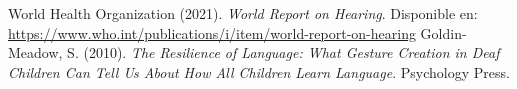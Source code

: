 \documentclass[12pt]{article}
\begin{document}
\newpage
\begin{thebibliography}{9}
 World Health Organization (2021). \textit{World Report on Hearing}. Disponible en: \url{https://www.who.int/publications/i/item/world-report-on-hearing}
 Goldin-Meadow, S. (2010). \textit{The Resilience of Language: What Gesture Creation in Deaf Children Can Tell Us About How All Children Learn Language}. Psychology Press.
\end{thebibliography}
\end{document}
